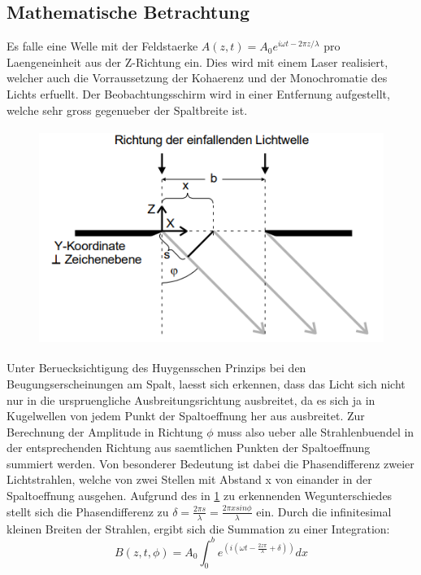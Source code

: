 \subsection{Mathematische Betrachtung}
Es falle eine Welle mit der Feldstaerke $A(z,t)=A_0e^{i\omega t-2\pi z/\lambda}$ pro Laengeneinheit aus der Z-Richtung ein. Dies wird mit einem Laser realisiert, welcher auch die Vorraussetzung der Kohaerenz und der Monochromatie des Lichts erfuellt. Der Beobachtungsschirm wird in einer Entfernung aufgestellt, welche sehr gross gegenueber der Spaltbreite ist. 
\begin{figure}[H]
    \centering
    \captionsetup{justification=centering}
    \includegraphics[height=7cm]{"Schema_BeugungSpalt.png"}
    \label{Fig:Schema}
\end{figure}
Unter Beruecksichtigung des Huygensschen Prinzips bei den Beugungserscheinungen am Spalt, laesst sich erkennen, dass das Licht sich nicht nur in die urspruengliche Ausbreitungsrichtung ausbreitet, da es sich ja in Kugelwellen von jedem Punkt der Spaltoeffnung her aus ausbreitet. Zur Berechnung der Amplitude in Richtung $\phi$ muss also ueber alle Strahlenbuendel in der entsprechenden Richtung aus saemtlichen Punkten der Spaltoeffnung summiert werden. Von besonderer Bedeutung ist dabei die Phasendifferenz zweier Lichtstrahlen, welche von zwei Stellen mit Abstand x von einander in der Spaltoeffnung ausgehen. Aufgrund des in \ref{Fig:Schema} zu erkennenden Wegunterschiedes stellt sich die Phasendifferenz zu $\delta=\frac{2\pi s}{\lambda}=\frac{2\pi x sin\phi}{\lambda}$ ein. Durch die infinitesimal kleinen Breiten der Strahlen, ergibt sich die Summation zu einer Integration:
\begin{equation*}
    B(z, t, \phi)=A_0\int_0^be^{(i(\omega t-\frac{2z\pi}{\lambda}+\delta))}dx
\end{equation*}
